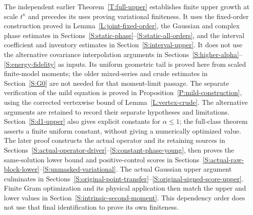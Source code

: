 \documentclass[12pt]{article}
\numberwithin{equation}{section}
\theoremstyle{definition}
\begin{document}
The independent earlier Theorem~\ref{T:full-upper} establishes finite
upper growth at scale $t^\kappa$ and precedes its uses proving
variational finiteness. It uses the fixed-order
construction proved in Lemma~\ref{L:joint-fixed-order}, the Gaussian
and complex phase estimates in Sections~\ref{S:static-phase}--\ref{S:static-all-orders},
and the interval coefficient and inventory estimates in
Section~\ref{S:interval-upper}. It does not use the alternative covariance
interpolation arguments in Sections~\ref{S:higher-alpha}--\ref{S:energy-fidelity}
as inputs. Its uniform geometric tail is proved here from scaled finite-model
moments; the older mixed-series and crude estimates in
Section~\ref{S:G0} are not needed for that moment-limit passage.
The separate verification of the mild equation is proved in
Proposition~\ref{P:mild-construction}, using the corrected
vertexwise bound of Lemma~\ref{L:vertex-crude}. The alternative
arguments are retained to record their separate hypotheses
and limitations. Section~\ref{S:d1-upper} also gives explicit constants for
$\alpha\le1$; the full-class theorem asserts a finite uniform constant,
without giving a numerically optimized value.
The later proof constructs the actual operator and its retaining sources
in Sections~\ref{S:actual-operator-driver}--\ref{S:constant-phase-young},
then proves the same-solution lower bound and positive-control scores
in Sections~\ref{S:actual-raw-block-lower}--\ref{S:unmasked-variational}.
The actual Gaussian upper argument culminates in
Sections~\ref{S:original-point-transfer}--\ref{S:original-signed-score-upper}.
Finite Gram optimization and its physical application then match the
upper and lower values in Section~\ref{S:intrinsic-second-moment}.
This dependency order does not use that final identification to prove
its own finiteness.
\end{document}
